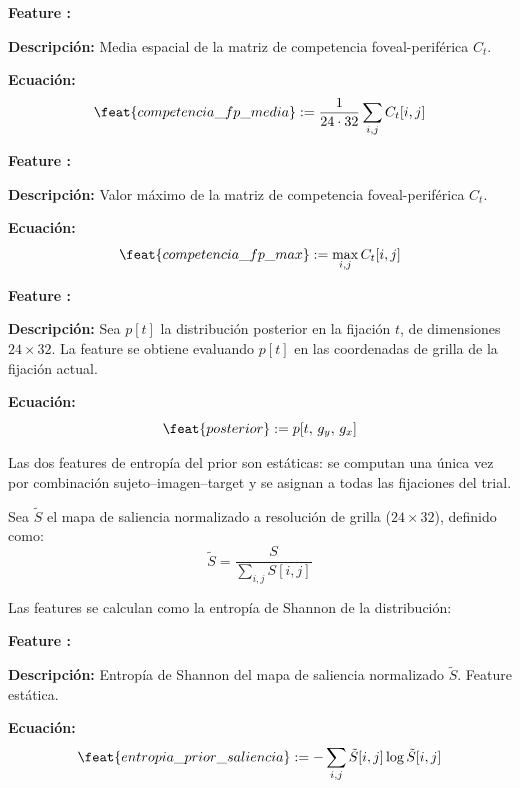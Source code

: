 \begin{featuredef}
\textbf{Feature \thetcbcounter:} 

\textbf{Descripción:} Media espacial de la matriz de competencia
foveal-periférica $C_t$.

\textbf{Ecuación:}
\begin{equation}
    \feat{competencia\_fp\_media} := \frac{1}{24 \cdot 32}
    \sum_{i,j} C_t[i, j]
\end{equation}
\end{featuredef}

\begin{featuredef}
\textbf{Feature \thetcbcounter:} 

\textbf{Descripción:} Valor máximo de la matriz de competencia
foveal-periférica $C_t$.

\textbf{Ecuación:}
\begin{equation}
    \feat{competencia\_fp\_max} := \max_{i,j} C_t[i, j]
\end{equation}
\end{featuredef}

\begin{featuredef}
\textbf{Feature \thetcbcounter:} 

\textbf{Descripción:} Sea $p[t]$ la distribución posterior en la fijación
$t$, de dimensiones $24 \times 32$. La feature se obtiene evaluando $p[t]$ en las
coordenadas de grilla de la fijación actual.

\textbf{Ecuación:}
\begin{equation}
    \feat{posterior} := p[t,\, g_y,\, g_x]
\end{equation}
\end{featuredef}

Las dos features de entropía del prior son estáticas: se computan
una única vez por combinación sujeto--imagen--target y se asignan
a todas las fijaciones del trial.

Sea $\tilde{S}$ el mapa de saliencia normalizado a resolución de
grilla ($24 \times 32$), definido como:
\begin{equation}
    \tilde{S} = \frac{S}{\sum_{i,j} S[i,j]}
\end{equation}

Las features se calculan como la entropía de Shannon de la distribución:

\begin{featuredef}
\textbf{Feature \thetcbcounter:} 

\textbf{Descripción:} Entropía de Shannon del mapa de saliencia
normalizado $\tilde{S}$. Feature estática.

\textbf{Ecuación:}
\begin{equation}
    \feat{entropia\_prior\_saliencia} :=
    -\sum_{i,j} \tilde{S}[i,j] \log \tilde{S}[i,j]
\end{equation}
\end{featuredef}



